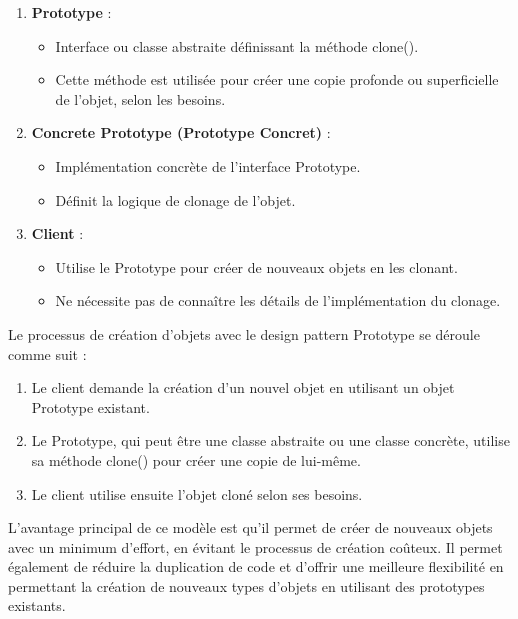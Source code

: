 \begin{enumerate}[leftmargin=*,labelsep=3mm]
    \item \textbf{Prototype} :
    \begin{itemize}
        \item Interface ou classe abstraite définissant la méthode clone().
        \item Cette méthode est utilisée pour créer une copie profonde ou superficielle de l'objet, selon les besoins.
    \end{itemize}
    
    \item \textbf{Concrete Prototype (Prototype Concret)} :
    \begin{itemize}
        \item Implémentation concrète de l'interface Prototype.
        \item Définit la logique de clonage de l'objet.
    \end{itemize}
    
    \item \textbf{Client} :
    \begin{itemize}
        \item Utilise le Prototype pour créer de nouveaux objets en les clonant.
        \item Ne nécessite pas de connaître les détails de l'implémentation du clonage.
    \end{itemize}
\end{enumerate}

Le processus de création d'objets avec le design pattern Prototype se déroule comme suit :

\begin{enumerate}[leftmargin=*,labelsep=3mm]
    \item Le client demande la création d'un nouvel objet en utilisant un objet Prototype existant.
    \item Le Prototype, qui peut être une classe abstraite ou une classe concrète, utilise sa méthode clone() pour créer une copie de lui-même.
    \item Le client utilise ensuite l'objet cloné selon ses besoins.
\end{enumerate}

L'avantage principal de ce modèle est qu'il permet de créer de nouveaux objets avec un minimum d'effort, en évitant le processus de création coûteux. Il permet également de réduire la duplication de code et d'offrir une meilleure flexibilité en permettant la création de nouveaux types d'objets en utilisant des prototypes existants.

